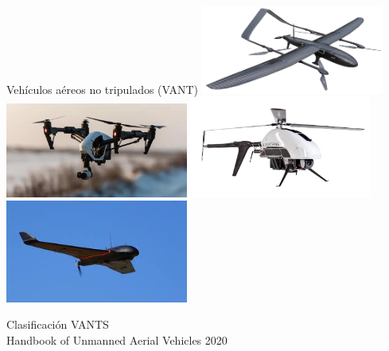 \documentclass[
  24pt, %
  aspectratio=169, %
]{beamer}
\begin{document}
\begin{frame}{Vehículos aéreos no tripulados (VANT)}
  \bigskip %
  \centering
  \includegraphics[width=0.45\textwidth,height=0.35\textheight]{img6}
  \hfil
  \includegraphics[width=0.45\textwidth,height=0.35\textheight]{img7}
  \vspace{2pt}
  \includegraphics[width=0.45\textwidth,height=0.35\textheight]{img8.jpg}
  \hfil
  \includegraphics[width=0.45\textwidth,height=0.35\textheight]{img9.jpg}
  \rule{0in}{1.2em} \small Clasificación VANTS \\
  \tiny  Handbook of Unmanned Aerial Vehicles 2020
\end{frame}
  
\end{document}
